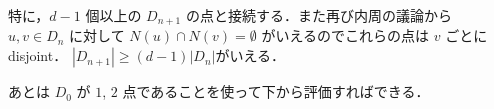 特に，$d-1$ 個以上の $D_{n+1}$ の点と接続する．また再び内周の議論から $u,v \in D_n$ に対して
$N(u)\cap N(v) = \emptyset$ がいえるのでこれらの点は $v$ ごとにdisjoint．
$|D_{n+1}|\geq (d-1) |D_n|$がいえる．

あとは $D_0$ が $1$, $2$ 点であることを使って下から評価すればできる．

\subsection{}

\subsection{}

\subsection{}

\subsection{}

\subsection{}

\subsection{}

\subsection{}

\subsection{}

\subsection{}

\subsection{}

\subsection{}

